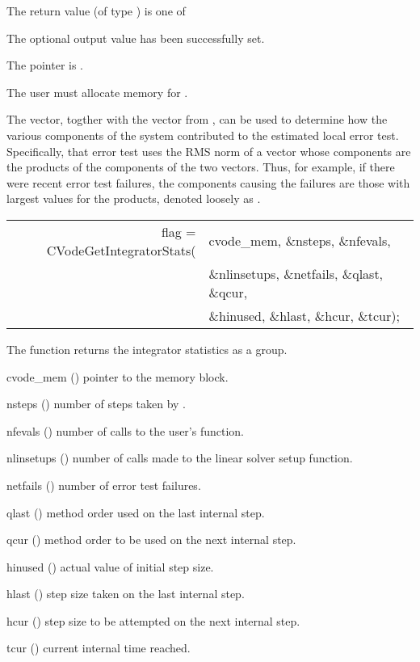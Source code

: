 {
  The return value  (of type ) is one of
  \begin{args}
  \item[\Id{CV\_SUCCESS}] 
    The optional output value has been successfully set.
  \item[\Id{CV\_MEM\_NULL}]
    The  pointer is .
  \end{args}
}
{
  {\warn}The user must allocate memory for .

  The  vector, togther with the  vector from
  , can be used to determine how the various
  components of the system contributed to the estimated local error
  test.  Specifically, that error test uses the RMS norm of a vector
  whose components are the products of the components of the two vectors.
  Thus, for example, if there were recent error test failures, the components
  causing the failures are those with largest values for the products,
  denoted loosely as .
}
{
  \begin{tabular}[t]{@{}r@{}l@{}}
    flag = CVodeGetIntegratorStats(&cvode\_mem, \&nsteps, \&nfevals, \\
                                   &\&nlinsetups, \&netfails, \&qlast, \&qcur, \\
                                   &\&hinused, \&hlast, \&hcur, \&tcur);
  \end{tabular}
}
{
  The function  returns the {\cvode} integrator
  statistics as a group.
}
{
  \begin{args}[nlinsetups]
  \item[cvode\_mem] ()
    pointer to the {\cvode} memory block.
  \item[nsteps] ()
    number of steps taken by {\cvode}.
  \item[nfevals] ()
    number of calls to the user's  function.
  \item[nlinsetups] ()
    number of calls made to the linear solver setup function.
  \item[netfails] ()
    number of error test failures.
  \item[qlast] ()
    method order used on the last internal step.
  \item[qcur] ()
    method order to be used on the next internal step.
  \item[hinused] ()
    actual value of initial step size.
  \item[hlast] ()
    step size taken on the last internal step.
  \item[hcur] ()
    step size to be attempted on the next internal step.
  \item[tcur] ()
    current internal time reached.
  \end{args}
}
